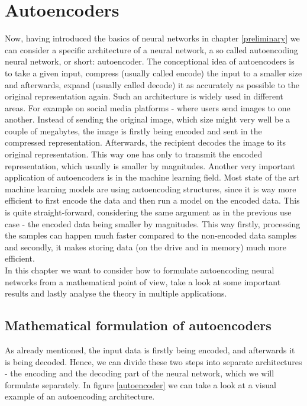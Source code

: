 \chapter{Autoencoders}

Now, having introduced the basics of neural networks in chapter \ref{preliminary} we can consider a specific architecture of a neural network, a so called autoencoding neural network, or short: autoencoder. The conceptional idea of autoencoders is to take a given input, compress (usually called encode) the input to a smaller size and afterwards, expand (usually called decode) it as accurately as possible to the original representation again. Such an architecture is widely used in different areas. For example on social media platforms - where users send images to one another. Instead of sending the original image, which size might very well be a couple of megabytes, the image is firstly being encoded and sent in the compressed representation. Afterwards, the recipient decodes the image to its original representation. This way one has only to transmit the encoded representation, which usually is smaller by magnitudes.
Another very important application of autoencoders is in the machine learning field. Most state of the art machine learning models are using autoencoding structures, since it is way more efficient to first encode the data and then run a model on the encoded data. This is quite straight-forward, considering the same argument as in the previous use case - the encoded data being smaller by magnitudes. This way firstly, processing the samples can happen much faster compared to the non-encoded data samples and secondly, it makes storing data (on the drive and in memory) much more efficient.\\
In this chapter we want to consider how to formulate autoencoding neural networks from a mathematical point of view, take a look at some important results and lastly analyse the theory in multiple applications.

\section{Mathematical formulation of autoencoders}

As already mentioned, the input data is firstly being encoded, and afterwards it is being decoded. Hence, we can divide these two steps into separate architectures - the encoding and the decoding part of the neural network, which we will formulate separately. In figure \ref{autoencoder} we can take a look at a visual example of an autoencoding architecture.



